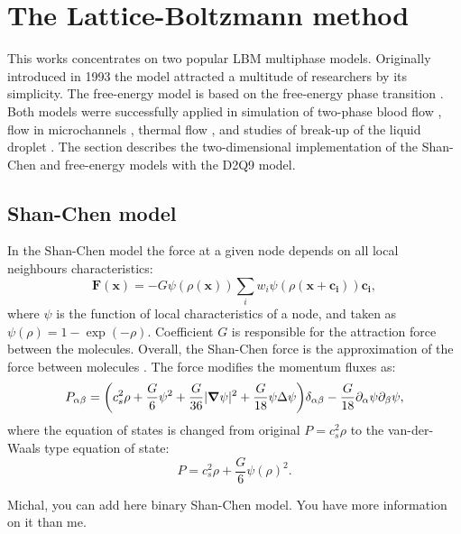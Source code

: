\documentclass[mathpazo,sort,numbers]{cicp}
\begin{document}
\section{The Lattice-Boltzmann method}
\label{sec:lbm:binary:liquids}
This works concentrates on two popular LBM multiphase models. Originally introduced
in 1993 \cite{Shan-chen:extended} the model attracted a multitude of researchers
by its simplicity.  The free-energy model \cite{swift} is based on the free-energy
phase transition \cite{landau}. Both models werre successfully applied in simulation
of two-phase blood flow \cite{halliday-multicomponent}, flow in microchannels
\cite{pooley-contact}, thermal flow \cite{zhang-thermal}, and studies of break-up
of the liquid droplet \cite{nourgaliev-breakup}. The section describes the
two-dimensional implementation of the Shan-Chen and free-energy models with
the D2Q9 model.

\subsection{Shan-Chen model}
In the Shan-Chen model \cite{Shan-chen:extended} the force at a given node depends
on all local neighbours characteristics:
\begin{equation}  \label{Shan-Chen:Shan-Chen:cont}
\bm{F}(\bm{x})=-G\psi(\rho(\bm{x}))\sum_{i}{w_i \psi(\rho(\bm{x}+\bm{c_i}))\bm{c_{i}}},
\end{equation}
where $\psi$ is the function of local characteristics of a node, and taken
as $\psi(\rho)=1-\exp(-\rho)$. Coefficient $G$ is responsible for the attraction
force between the molecules. Overall, the Shan-Chen force is the approximation of
the force between molecules \cite{kwok,kwok-contact-angle}. The force modifies
the momentum fluxes as:
\begin{equation*}
P_{\alpha\beta}=\biggl(c_s^2\rho+\frac{G}{6}\psi^2+\frac{G}{36}%
|\bm{\nabla}\psi|^2 +\frac{G}{18}\psi\Delta\psi\biggr)\delta_{\alpha\beta}-\frac{G}{%
18}\partial_{\alpha}\psi\partial_{\beta}\psi,
\end{equation*}
where the equation of states is changed from original $P=c_s^2 \rho$ \cite{Succi-book}
to the van-der-Waals type equation of state:
\begin{equation}
P=c_s^2 \rho +\frac{G}{6} \psi(\rho)^2.
\end{equation}

{\color{red} Michal, you can add here binary Shan-Chen model. You have more information on it than me.}
\end{document}

